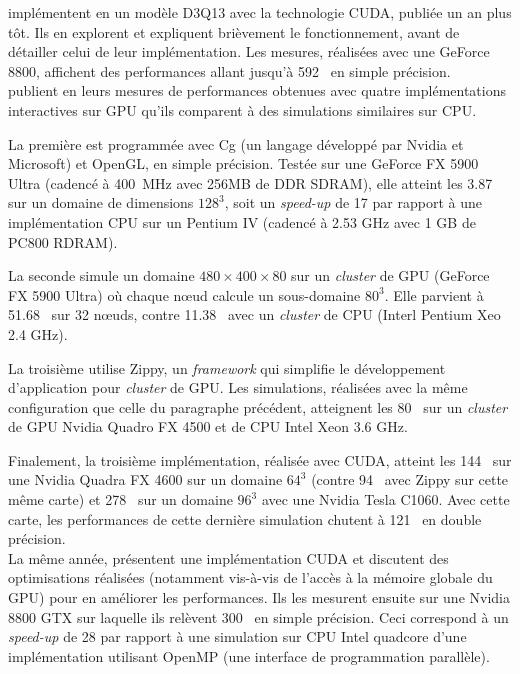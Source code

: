 \citet{toelke_teraflop_2008} implémentent en \citeyear{toelke_teraflop_2008}  un modèle D3Q13 avec la technologie CUDA, publiée un an plus tôt. Ils en explorent et expliquent brièvement le fonctionnement, avant de détailler celui de leur implémentation. Les mesures, réalisées avec une GeForce 8800, affichent des performances allant jusqu'à 592~  en simple précision.\\

\citet{kaufman_implementing_2009} publient en \citeyear{kaufman_implementing_2009} leurs mesures de performances obtenues avec quatre implémentations interactives sur \acs{GPU} qu'ils comparent à des simulations similaires sur \acs{CPU}. 

La première est programmée avec Cg (un langage développé par Nvidia et Microsoft) et OpenGL, en simple précision. Testée sur une GeForce FX 5900 Ultra (cadencé à 400~MHz avec 256MB de DDR SDRAM), elle atteint les 3.87~  sur un domaine de dimensions $128^3$, soit un \textit{speed-up} de 17 par rapport à une implémentation \acs{CPU} sur un Pentium IV (cadencé à 2.53 GHz avec 1 GB de PC800 RDRAM).

La seconde simule un domaine $480 \times 400 \times 80$ sur un \textit{cluster} de \acs{GPU} (GeForce FX 5900 Ultra) où chaque nœud calcule un sous-domaine $80^3$. Elle parvient à 51.68~  sur 32 nœuds, contre 11.38~  avec un \textit{cluster} de \acs{CPU} (Interl Pentium Xeo 2.4 GHz).

La troisième utilise Zippy, un \textit{framework} qui simplifie le développement d'application pour \textit{cluster} de \acs{GPU}. Les simulations, réalisées avec la même configuration que celle du paragraphe précédent, atteignent les 80~ sur un \textit{cluster} de \acs{GPU} Nvidia Quadro FX 4500 et de \acs{CPU} Intel Xeon 3.6 GHz.

Finalement, la troisième implémentation, réalisée avec CUDA, atteint les 144~  sur une Nvidia Quadra FX 4600 sur un domaine $64^3$ (contre 94~  avec Zippy sur cette même carte) et 278~  sur un domaine $96^3$ avec une Nvidia Tesla C1060. Avec cette carte, les performances de cette dernière simulation chutent à 121~  en double précision.\\

La même année, \citet{bailey_accelerating_2009} présentent une implémentation CUDA et discutent des optimisations réalisées (notamment vis-à-vis de l'accès à la mémoire globale du \acs{GPU}) pour en améliorer les performances. Ils les mesurent ensuite sur une Nvidia 8800 GTX sur laquelle ils relèvent 300~ en simple précision. Ceci correspond à un \textit{speed-up} de 28 par rapport à une simulation sur \acs{CPU} Intel quadcore d'une implémentation utilisant OpenMP (une interface de programmation parallèle). 


